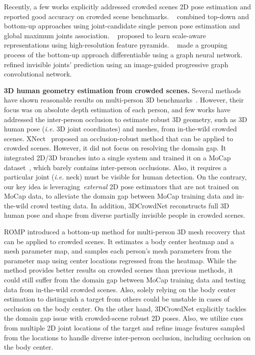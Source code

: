 \documentclass[10pt,twocolumn,letterpaper]{article}
\begin{document}
Recently, a few works explicitly addressed crowded scenes 2D pose estimation and reported good accuracy on crowded scene benchmarks.
~\cite{li2019crowdpose} combined top-down and bottom-up approaches using joint-candidate single person pose estimation and global maximum joints association.
~\cite{cheng2020higherhrnet} proposed to learn scale-aware representations using high-resolution feature pyramids.
~\cite{jin2020differentiable} made a grouping process of the bottom-up approach differentiable using a graph neural network. 
~\cite{qiu2020peeking} refined invisible joints' prediction using an image-guided progressive graph convolutional network.














\noindent\textbf{3D human geometry estimation from crowded scenes.}
Several methods~\cite{moon2019camera,wang2020hmor,zhen2020smap} have shown reasonable results on multi-person 3D benchmarks~\cite{joo2017panoptic,mehta2017monocular}.
However, their focus was on absolute depth estimation of each person, and few works have addressed the inter-person occlusion to estimate robust 3D geometry, such as 3D human pose (\textit{i.e.} 3D joint coordinates) and meshes, from in-the-wild crowded scenes.
XNect~\cite{mehta2020xnect} proposed an occlusion-robust method that can be applied to crowded scenes.
However, it did not focus on resolving the domain gap.
It integrated 2D/3D branches into a single system and trained it on a MoCap dataset~\cite{mehta2018single}, which barely contains inter-person occlusions.
Also, it requires a particular joint (\textit{i.e.} neck) must be visible for human detection.
On the contrary, our key idea is leveraging~\textit{external} 2D pose estimators that are not trained on MoCap data, to alleviate the domain gap between MoCap training data and in-the-wild crowd testing data.
In addition, 3DCrowdNet reconstructs full 3D human pose and shape from diverse partially invisible people in crowded scenes.


ROMP\cite{sun2021monocular} introduced a bottom-up method for multi-person 3D mesh recovery that can be applied to crowded scenes.
It estimates a body center heatmap and a mesh parameter map, and samples each person's mesh parameters from the parameter map using center locations regressed from the heatmap.
While the method provides better results on crowded scenes than previous methods, it could still suffer from the domain gap between MoCap training data and testing data from in-the-wild crowded scenes.
Also, solely relying on the body center estimation to distinguish a target from others could be unstable in cases of occlusion on the body center.
On the other hand, 3DCrowdNet explicitly tackles the domain gap issue with crowded-scene robust 2D poses.
Also, we utilize cues from multiple 2D joint locations of the target and refine image features sampled from the locations to handle diverse inter-person occlusion, including occlusion on the body center.
\end{document}
